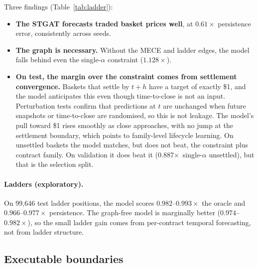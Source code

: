 \documentclass[11pt,a4paper]{article}
\newcommand{\x}{\ensuremath{\times}}
\begin{document}
Three findings (Table~\ref{tab:ladder}):
\begin{itemize}
  \item \textbf{The STGAT forecasts traded basket prices well}, at $0.61\x$
    persistence error, consistently across seeds.
  \item \textbf{The graph is necessary.} Without the MECE and ladder edges, the
    model falls behind even the single-$\alpha$ constraint ($1.128\x$).
  \item \textbf{On test, the margin over the constraint comes from settlement
    convergence.} Baskets that settle by $t+h$ have a target of exactly \$1, and
    the model anticipates this even though time-to-close is not an input.
    Perturbation tests confirm that predictions at $t$ are unchanged when future
    snapshots or time-to-close are randomised, so this is not leakage. The
    model's pull toward \$1 rises smoothly as close approaches, with no jump at
    the settlement boundary, which points to family-level lifecycle learning.
    On unsettled baskets the model matches, but does not beat, the constraint
    plus contract family. On validation it does beat it (0.887\x\ single-$\alpha$
    unsettled), but that is the selection split.
\end{itemize}

\paragraph{Ladders (exploratory).} On 99{,}646 test ladder positions, the model
scores $0.982$--$0.993\x$ the oracle and $0.966$--$0.977\x$ persistence. The
graph-free model is marginally better ($0.974$--$0.982\x$), so the small ladder
gain comes from per-contract temporal forecasting, not from ladder structure.

\subsection{Executable boundaries}\label{sec:exec}
\end{document}
